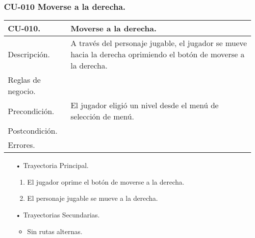 \subsubsection{CU-010 Moverse a la derecha.} \label{CU:10}
\begin{longtable}[c]{ | m{5cm} | m{10cm}|} 
		\hline
		\rowcolor{cyan}CU-010. & Moverse a la derecha.\\ 
		\hline
		Descripción. & A través del personaje jugable, el jugador se mueve hacia la derecha oprimiendo el botón de moverse a la derecha. \\ 
		\hline
		Reglas de negocio. &\\ 
		\hline
		Precondición. & El jugador eligió un nivel desde el menú de selección de menú.\\
		\hline
		Postcondición. & \\
		\hline
		Errores. & \\
		\hline
\end{longtable}

\begin{itemize}
	\item[•] Trayectoria Principal.
		\begin{enumerate}
			\item El jugador oprime el botón de moverse a la derecha.
			\item El personaje jugable se mueve a la derecha.

		\end{enumerate}
	\item[•] Trayectorias Secundarias.
		\begin{itemize}
			\item Sin rutas alternas.
		\end{itemize}
\end{itemize}